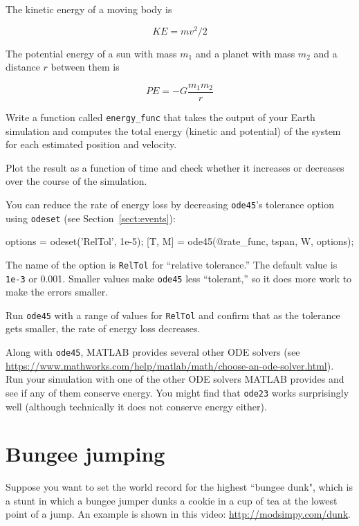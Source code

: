 \documentclass[
]{book}
\numberwithin{Answer}{chapter}
\numberwithin{Exercise}{chapter}
\begin{document}
The kinetic energy of a moving body is

\begin{equation*}
KE = m v^2 / 2
\end{equation*}

The potential energy of a sun with mass $m_1$ and a
planet with mass $m_2$ and a distance $r$ between them is

\begin{equation}
PE = -G \frac{m_1 m_2}{r}
\end{equation}

Write a function called {\tt energy\_func} that takes the output of
your Earth simulation and computes the total
energy (kinetic and potential) of the system for each estimated
position and velocity.

Plot the result as a function of time and
check whether it increases or  decreases over the course of the simulation.

You can reduce the rate of energy loss by decreasing {\tt ode45}'s
tolerance option using {\tt odeset} (see Section~\ref{sect:events}):

\begin{code}
options = odeset('RelTol', 1e-5);
[T, M] = ode45(@rate_func, tspan, W, options);
\end{code}

The name of the option is {\tt RelTol} for ``relative tolerance.''
The default value is {\tt 1e-3} or 0.001.  Smaller values
make {\tt ode45} less ``tolerant,'' so it does more work to
make the errors smaller.

Run {\tt ode45} with a range of values for {\tt RelTol} and confirm
that as the tolerance gets smaller, the rate of energy loss
decreases.

Along with {\tt ode45}, MATLAB provides several other ODE solvers (see \url{https://www.mathworks.com/help/matlab/math/choose-an-ode-solver.html}).
Run your simulation with one of the other ODE solvers MATLAB provides
and see if any of them conserve energy.  You might find that {\tt ode23} works surprisingly well (although technically it does not conserve energy either).


\section{Bungee jumping}
\label{bungee}

Suppose you want to set the world record for the highest ``bungee dunk", which is a stunt in which a bungee jumper dunks a cookie in a cup of tea at the lowest point of a jump.  An example is shown in this video: \url{http://modsimpy.com/dunk}.
\end{document}
